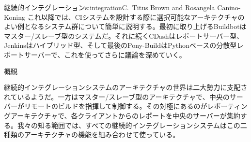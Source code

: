 \begin{aosachapter}{継続的インテグレーション}{s:integration}{C.\ Titus Brown and Rosangela Canino-Koning}
これ以降では、CIシステムを設計する際に選択可能なアーキテクチャのよい例となるシステム群について簡単に説明する。最初に取り上げるBuildbotはマスター/スレーブ型のシステムだ。それに続くCDashはレポートサーバー型、Jenkinsはハイブリッド型、そして最後のPony-BuildはPythonベースの分散型レポートサーバーで、これを使ってさらに議論を深めていく。

\begin{aosasect1}{概観}

継続的インテグレーションシステムのアーキテクチャの世界は二大勢力に支配されているようだ。一方はマスター/スレーブ型のアーキテクチャで、中央のサーバーがリモートのビルドを指揮して制御する。その対極にあるのがレポーティングアーキテクチャで、各クライアントからのレポートを中央のサーバーが集約する。我々の知る範囲では、すべての継続的インテグレーションシステムはこの二種類のアーキテクチャの機能を組み合わせて使っている。


\end{aosasect1}
\end{aosachapter}
